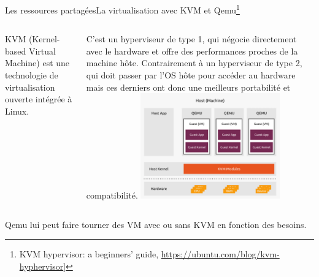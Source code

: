 \documentclass{beamer}
\begin{document}
    \begin{frame}{Les ressources partagées}{La virtualisation avec KVM et Qemu\footnote{\label{ubuntukvm}KVM hypervisor: a beginners’ guide, \url{https://ubuntu.com/blog/kvm-hyphervisor}]}}
        \begin{columns}
            KVM (Kernel-based Virtual Machine) est une technologie de virtualisation ouverte intégrée à Linux.

            C'est un hyperviseur de type 1, qui négocie directement avec le hardware et offre des performances proches de la machine hôte.
            Contrairement à un hyperviseur de type 2, qui doit passer par l'OS hôte pour accéder au hardware mais ces derniers ont donc une meilleurs portabilité et compatibilité.
            \centering
            \includegraphics[width=6cm]{image/kvm-qemu}
        \end{columns}
        \bigbreak
        Qemu lui peut faire tourner des VM avec ou sans KVM en fonction des besoins.
    \end{frame}
\end{document}

